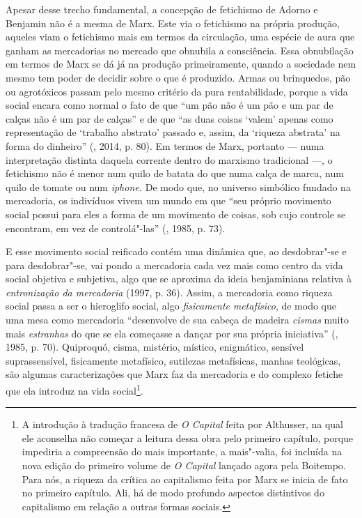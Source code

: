 Apesar desse trecho fundamental, a concepção de fetichismo de Adorno e
Benjamin não é a mesma de Marx. Este via o fetichismo na própria
produção, aqueles viam o fetichismo mais em termos da circulação, uma
espécie de aura que ganham as mercadorias no mercado que obnubila a
consciência. Essa obnubilação em termos de Marx se dá já na produção
primeiramente, quando a sociedade nem mesmo tem poder de decidir sobre o
que é produzido. Armas ou brinquedos, pão ou agrotóxicos passam pelo
mesmo critério da pura rentabilidade, porque a vida social encara como
normal o fato de que ``um pão não é um pão e um par de calças não é um
par de calças'' e de que ``as duas coisas `valem' apenas como
representação de `trabalho abstrato' passado e, assim, da `riqueza
abstrata' na forma do dinheiro'' (, 2014, p. 80). Em termos de
Marx, portanto --- numa interpretação distinta daquela corrente dentro do marxismo
tradicional ---, o fetichismo não é menor num quilo de batata do que numa
calça de marca, num quilo de tomate ou num \emph{iphone.} De modo que,
no universo simbólico fundado na mercadoria, os indivíduos vivem um
mundo em que ``seu próprio movimento social possui para eles a forma de
um movimento de coisas, sob cujo controle se encontram, em vez de
controlá"-las'' (, 1985, p. 73).

E esse movimento social reificado contém uma dinâmica que, ao
desdobrar"-se e para desdobrar"-se, vai pondo a mercadoria cada vez mais
como centro da vida social objetiva e subjetiva, algo que se aproxima da
ideia benjaminiana relativa à \emph{entronização da mercadoria} (1997, p. 36).
Assim, a mercadoria como riqueza social passa a ser o hieroglifo social,
algo \emph{fisicamente} \emph{metafísico}, de modo que uma mesa como
mercadoria ``desenvolve de sua cabeça de madeira \emph{cismas} muito
mais \emph{estranhas} do que se ela começasse a dançar por sua própria
iniciativa'' (, 1985, p. 70). Quiproquó, cisma, mistério, místico,
enigmático, sensível suprassensível, fisicamente metafísico, sutilezas
metafísicas, manhas teológicas, são algumas caracterizações que Marx faz
da mercadoria e do complexo fetiche que ela introduz na vida
social\footnote{A introdução à tradução francesa de \emph{O Capital}
  feita por Althusser, na qual ele aconselha não começar a leitura dessa
  obra pelo primeiro capítulo, porque impediria a compreensão do mais
  importante, a mais"-valia, foi incluída na nova edição do primeiro
  volume de \emph{O Capital} lançado agora pela Boitempo. Para nós, a
  riqueza da crítica ao capitalismo feita por Marx se inicia de fato no
  primeiro capítulo. Ali, há de modo profundo aspectos distintivos do
  capitalismo em relação a outras formas sociais.}.

